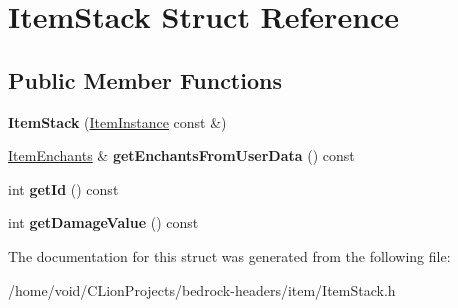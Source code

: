 \hypertarget{struct_item_stack}{}\section{Item\+Stack Struct Reference}
\label{struct_item_stack}
\subsection*{Public Member Functions}
\begin{DoxyCompactItemize}
\item 
\mbox{\label{struct_item_stack_aa114dfd50ef1ea4a8207ba70a0ae5dc2}} 
{\bfseries Item\+Stack} (\mbox{\hyperlink{struct_item_instance}{Item\+Instance}} const \&)
\item 
\mbox{\label{struct_item_stack_a7b3773dfc44d4108886bbca7558b2810}} 
\mbox{\hyperlink{struct_item_enchants}{Item\+Enchants}} \& {\bfseries get\+Enchants\+From\+User\+Data} () const
\item 
\mbox{\label{struct_item_stack_a016df15ad3b12a9dc1e3430b0ca9e77d}} 
int {\bfseries get\+Id} () const
\item 
\mbox{\label{struct_item_stack_a77a5db77d7e9b18d14e26dc16447d05a}} 
int {\bfseries get\+Damage\+Value} () const
\end{DoxyCompactItemize}


The documentation for this struct was generated from the following file\+:\begin{DoxyCompactItemize}
\item 
/home/void/\+C\+Lion\+Projects/bedrock-\/headers/item/Item\+Stack.\+h\end{DoxyCompactItemize}
